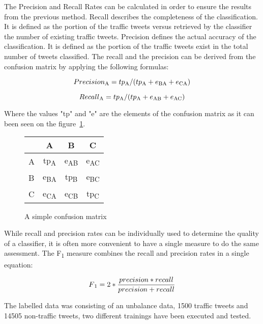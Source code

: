 The Precision and Recall Rates can be calculated in order to ensure the results from the previous method. Recall describes the completeness of the classification. It is defined as the portion of the traffic tweets versus retrieved by the classifier the number of existing traffic tweets. Precision defines the actual accuracy of the classification. It is defined as the portion of the traffic tweets exist in the total number of tweets classified. The recall and the precision can be derived from the confusion matrix by applying the following formulas:

\[ Precision\textsubscript{A} = tp\textsubscript{A}/(tp\textsubscript{A}+e\textsubscript{BA}+e\textsubscript{CA}) \]

\[ Recall\textsubscript{A} = tp\textsubscript{A}/(tp\textsubscript{A}+e\textsubscript{AB}+e\textsubscript{AC}) \]

Where the values "tp" and "e" are the elements of the confusion matrix as it can been seen on the figure~\ref{fig:confisionMatixCalc}.

\begin{figure}[h!]
\begin{center}
\begin{tabular}{| l || c | c | c | }
    \hline
        & A & B & C  \\ \hline \hline
        A & tp\textsubscript{A} & e\textsubscript{AB} & e\textsubscript{AC} \\ \hline
        B & e\textsubscript{BA }& tp\textsubscript{B} & e\textsubscript{BC} \\\hline
        C & e\textsubscript{CA} & e\textsubscript{CB} & tp\textsubscript{C} \\\hline
    \end{tabular}
	\caption{A simple confusion matrix}
    \label{fig:confisionMatixCalc}
\end{center}
\end{figure}

While recall and precision rates can be individually used to determine the quality of a classifier, it is often more convenient to have a single measure to do the same assessment. The F\textsubscript{1} measure combines the recall and precision rates in a single equation:

\[ F\textsubscript{1} = 2*\frac{precision*recall}{precision+recall} \]

The labelled data was consisting of an unbalance data, 1500 traffic tweets and 14505 non-traffic tweets, two different trainings have been executed and tested. 

